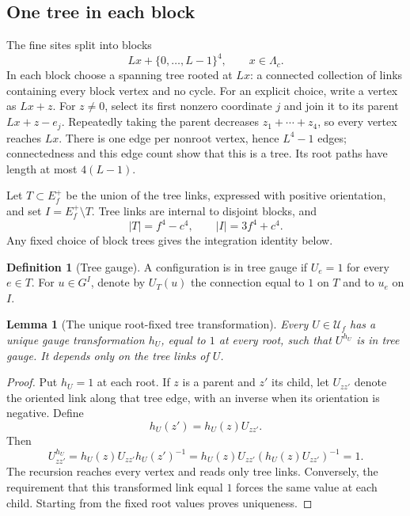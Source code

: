 \documentclass[11pt,reqno]{amsart}
\numberwithin{equation}{section}
\newtheorem{lemma}[theorem]{Lemma}
\theoremstyle{definition}
\newtheorem{definition}[theorem]{Definition}
\theoremstyle{remark}
\begin{document}
\subsection{One tree in each block}

The fine sites split into blocks
\[
                  Lx+\{0,\ldots,L-1\}^4,\qquad x\in\Lambda_c.
\]
In each block choose a spanning tree rooted at \(Lx\): a connected
collection of links containing every block vertex and no cycle.
For an explicit choice, write a vertex as \(Lx+z\). For \(z\ne0\),
select its first nonzero coordinate \(j\) and join it to its parent
\(Lx+z-e_j\). Repeatedly taking the parent decreases
\(z_1+\cdots+z_4\), so every vertex reaches \(Lx\).
There is one edge per nonroot vertex, hence \(L^4-1\) edges;
connectedness and this edge count show that this is a tree.
Its root paths have length at most \(4(L-1)\).

Let \(T\subset E_f^+\) be the union of the tree links, expressed
with positive orientation, and set \(I=E_f^+\setminus T\).
Tree links are internal to disjoint blocks, and
\begin{equation}
       |T|=f^4-c^4,\qquad |I|=3f^4+c^4.
 \label{eq:tree-count}
\end{equation}
Any fixed choice of block trees gives the integration identity below.

\begin{definition}[Tree gauge]
A configuration is in tree gauge if \(U_e=1\) for every \(e\in T\).
For \(u\in G^I\), denote by \(U_T(u)\) the connection equal to \(1\)
on \(T\) and to \(u_e\) on \(I\).
\end{definition}

\begin{lemma}[The unique root-fixed tree transformation]
\label{lem:tree-transformation}
Every \(U\in\mathcal U_f\) has a unique gauge transformation
\(h_U\), equal to \(1\) at every root, such that \(U^{h_U}\)
is in tree gauge. It depends only on the tree links of \(U\).
\end{lemma}
\begin{proof}
Put \(h_U=1\) at each root. If \(z\) is a parent and \(z'\) its
child, let \(U_{zz'}\) denote the oriented link along that tree
edge, with an inverse when its orientation is negative. Define
\[
                           h_U(z')=h_U(z)U_{zz'}.
\]
Then
\[
 U^{h_U}_{zz'}=h_U(z)U_{zz'}h_U(z')^{-1}
                =h_U(z)U_{zz'}(h_U(z)U_{zz'})^{-1}=1.
\]
The recursion reaches every vertex and reads only tree links.
Conversely, the requirement that this transformed link equal \(1\)
forces the same value at each child. Starting from the fixed root
values proves uniqueness.
\end{proof}
\end{document}
